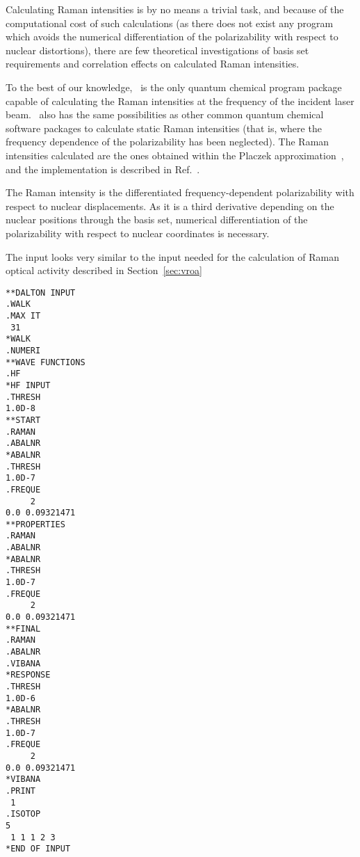 \begin{center}
\end{center}

 Calculating Raman intensities is by no means
a trivial task, and
because of the computational cost of such calculations (as there does
not exist any program which avoids the numerical differentiation of the
polarizability with respect to nuclear distortions), there are
few theoretical investigations of basis set requirements and
correlation effects on calculated Raman intensities.

To the best of our knowledge, \siraba\ is the only quantum chemical program package capable of
calculating the Raman intensities at the frequency of the incident
laser beam. \siraba\ also has the same possibilities as other
common quantum chemical software packages to calculate static
Raman intensities (that is, where the frequency dependence of the
polarizability has been neglected). The Raman intensities calculated
are the ones obtained within the Placzek
approximation~\cite{placzek},
and the implementation is described in Ref.~\cite{thkrklbpjjofd99}.

The Raman intensity is the differentiated frequency-dependent
polarizability with respect to nuclear displacements.
As it is a third derivative depending on the nuclear positions through
the basis set, numerical differentiation of
the polarizability with respect to nuclear coordinates is
necessary.

The input looks very similar to the input needed for the calculation
of Raman optical activity  described
in Section~\ref{sec:vroa}

\begin{verbatim}
**DALTON INPUT
.WALK
.MAX IT
 31
*WALK
.NUMERI
**WAVE FUNCTIONS
.HF
*HF INPUT
.THRESH
1.0D-8
**START
.RAMAN
.ABALNR
*ABALNR
.THRESH
1.0D-7
.FREQUE
     2
0.0 0.09321471
**PROPERTIES
.RAMAN
.ABALNR
*ABALNR
.THRESH
1.0D-7
.FREQUE
     2
0.0 0.09321471
**FINAL
.RAMAN
.ABALNR
.VIBANA
*RESPONSE
.THRESH
1.0D-6
*ABALNR
.THRESH
1.0D-7
.FREQUE
     2
0.0 0.09321471
*VIBANA
.PRINT
 1
.ISOTOP
5
 1 1 1 2 3
*END OF INPUT
\end{verbatim}

